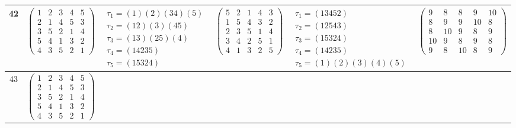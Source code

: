 \begin{longtable}{|c|p{2.7cm}|p{2.7cm}|p{2.7cm}|p{2.7cm}|p{3.3cm}|}
    \hline
    42                                                                                                                                          &
    $\begin{pmatrix}1&2&3&4&5\\2&1&4&5&3\\3&5&2&1&4\\5&4&1&3&2\\4&3&5&2&1\end{pmatrix}$                                                         &
    $\begin{array}{l}\tau_{1}=(1)(2)(34)(5)\\ \tau_{2}=(12)(3)(45)\\ \tau_{3}=(13)(25)(4)\\ \tau_{4}=(14235)\\ \tau_{5}=(15324)\end{array}$     &
    $\begin{pmatrix}5&2&1&4&3\\1&5&4&3&2\\2&3&5&1&4\\3&4&2&5&1\\4&1&3&2&5\end{pmatrix}$                                                         &
    $\begin{array}{l}\tau_{1}=(13452)\\ \tau_{2}=(12543)\\ \tau_{3}=(15324)\\ \tau_{4}=(14235)\\ \tau_{5}=(1)(2)(3)(4)(5)\end{array}$           &
    $\begin{pmatrix}9&8&8&9&10\\8&9&9&10&8\\8&10&9&8&9\\10&9&8&9&8\\9&8&10&8&9\end{pmatrix}$                                                                                                                                \\
    \hline
    43                                                                                                                                          &
    $\begin{pmatrix}1&2&3&4&5\\2&1&4&5&3\\3&5&2&1&4\\5&4&1&3&2\\4&3&5&2&1\end{pmatrix}$                                                         &

\end{longtable}
